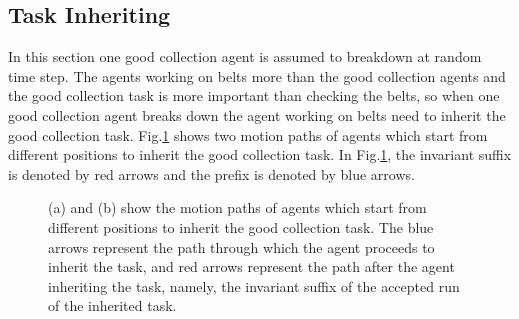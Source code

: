 \documentclass[journal]{IEEEtran}
\begin{document}
\subsection{Task Inheriting}
In this section one good collection agent is assumed to breakdown at random time step. The agents working on belts more than the good collection agents and the good collection task is more important than checking the belts, so when one good collection agent breaks down the agent working on belts need to inherit the good collection task. Fig.\ref{third} shows two motion paths of agents which start from different positions to inherit the good collection task. In Fig.\ref{third}, the invariant suffix is denoted by red arrows and the prefix is denoted by blue arrows.
\begin{figure}
\centering
{}
\hspace{0.3in}
\caption{(a) and (b) show the motion paths of agents which start from different positions to inherit the good collection task. The blue arrows represent the path through which the agent proceeds to inherit the task, and red arrows represent the path after the agent inheriting the task, namely, the invariant suffix of the accepted run of the inherited task. }
\label{third}
\end{figure}

\end{document}
